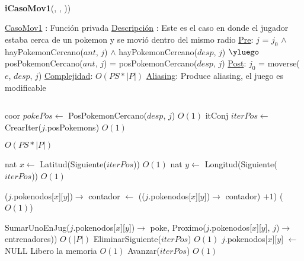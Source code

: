 \begin{Algoritmos}
\begin{algorithmic}[1]
\end{algorithmic}



$ $\newline
$ $\newline


{\textbf{iCasoMov1}(,  , ))}
\begin{algorithmic}[1]

\Statex \underline{CasoMov1} : Funci\'on privada 
\Statex \underline{Descripci\'on} : Este es el caso en donde el jugador estaba cerca de un pokemon y se movi\'o dentro del mismo radio 
\Statex \underline{Pre}: $j$ = $j_0$ $\land$ hayPokemonCercano($ant$, $j$) $\land$ hayPokemonCercano($desp$, $j$) $\yluego$ posPokemonCercano($ant$, $j$) = posPokemonCercano($desp$, $j$) 
\Statex \underline{Post}: $j_0$ = moverse($e$, $desp$, $j$) 
\Statex \underline{Complejidad}: $O(PS *|P|)$ 
\Statex \underline{Aliasing}: Produce aliasing, el juego es modificable

$ $\newline

\State coor $pokePos \gets$ PosPokemonCercano($desp$, $j$) \Comment $O(1)$
\State itConj $iterPos \gets$ CrearIter($j$.posPokemons) \Comment $O(1)$ 

  \Comment $O(PS * |P|)$

  \State nat $x \gets$ Latitud(Siguiente($iterPos$)) \Comment $O(1)$
  \State nat $y \gets$ Longitud(Siguiente($iterPos$)) \Comment $O(1)$   
  
    \State ($j$.pokenodos[$x$][$y$])$\rightarrow$ contador $\gets$ (($j$.pokenodos[$x$][$y$])$\rightarrow$ contador) $+ 1$) \Comment($O(1)$)
  \EndIf
  
    \State SumarUnoEnJug($j$.pokenodos[$x$][$y$])$\rightarrow$ poke, Proximo($j$.pokenodos[$x$][$y$], $j$)$\rightarrow$ entrenadores)) \Comment $O(|P|)$
    \State EliminarSiguiente($iterPos$) \Comment $O(1)$
    \State $j$.pokenodos[$x$][$y$] $\gets$ NULL \Comment Libero la memoria $O(1)$
  \Else 
    \State Avanzar($iterPos$) \Comment $O(1)$ 
  \EndIf

\EndWhile 


\end{algorithmic}
\end{Algoritmos}
